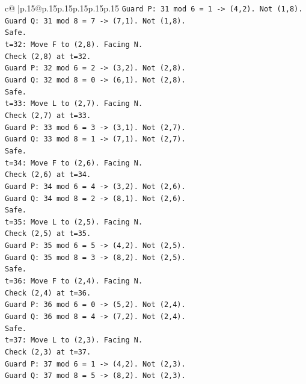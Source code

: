 \documentclass{article}
\begin{document}
{\begin{supertabular}{c@{$\;$}|p{.15\linewidth}@{}p{.15\linewidth}p{.15\linewidth}p{.15\linewidth}p{.15\linewidth}p{.15\linewidth}}
{{{\texttt{Guard P: 31 mod 6 = 1 {-}> (4,2). Not (1,8).} \\
\texttt{Guard Q: 31 mod 8 = 7 {-}> (7,1). Not (1,8).} \\
\texttt{Safe.} \\
\texttt{t=32: Move F to (2,8). Facing N.} \\
\texttt{Check (2,8) at t=32.} \\
\texttt{Guard P: 32 mod 6 = 2 {-}> (3,2). Not (2,8).} \\
\texttt{Guard Q: 32 mod 8 = 0 {-}> (6,1). Not (2,8).} \\
\texttt{Safe.} \\
\texttt{t=33: Move L to (2,7). Facing N.} \\
\texttt{Check (2,7) at t=33.} \\
\texttt{Guard P: 33 mod 6 = 3 {-}> (3,1). Not (2,7).} \\
\texttt{Guard Q: 33 mod 8 = 1 {-}> (7,1). Not (2,7).} \\
\texttt{Safe.} \\
\texttt{t=34: Move F to (2,6). Facing N.} \\
\texttt{Check (2,6) at t=34.} \\
\texttt{Guard P: 34 mod 6 = 4 {-}> (3,2). Not (2,6).} \\
\texttt{Guard Q: 34 mod 8 = 2 {-}> (8,1). Not (2,6).} \\
\texttt{Safe.} \\
\texttt{t=35: Move L to (2,5). Facing N.} \\
\texttt{Check (2,5) at t=35.} \\
\texttt{Guard P: 35 mod 6 = 5 {-}> (4,2). Not (2,5).} \\
\texttt{Guard Q: 35 mod 8 = 3 {-}> (8,2). Not (2,5).} \\
\texttt{Safe.} \\
\texttt{t=36: Move F to (2,4). Facing N.} \\
\texttt{Check (2,4) at t=36.} \\
\texttt{Guard P: 36 mod 6 = 0 {-}> (5,2). Not (2,4).} \\
\texttt{Guard Q: 36 mod 8 = 4 {-}> (7,2). Not (2,4).} \\
\texttt{Safe.} \\
\texttt{t=37: Move L to (2,3). Facing N.} \\
\texttt{Check (2,3) at t=37.} \\
\texttt{Guard P: 37 mod 6 = 1 {-}> (4,2). Not (2,3).} \\
\texttt{Guard Q: 37 mod 8 = 5 {-}> (8,2). Not (2,3).} \\
}}}
\end{supertabular}}
\end{document}
